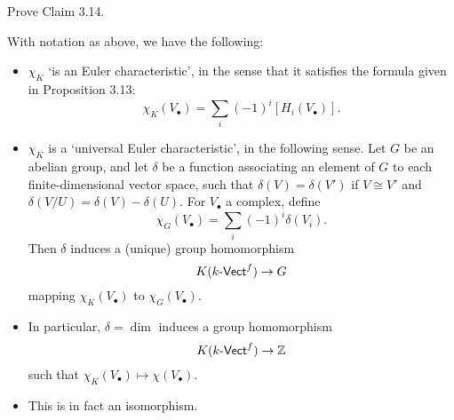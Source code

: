 \documentclass[../../master.tex]{subfiles}
\begin{document}
\begin{problem}
    Prove Claim 3.14.
    \begin{proposition}[Claim 3.14] 
        With notation as above, we have the following:
        \begin{itemize}
            \item $\chi_K$ `is an Euler characteristic', in the sense that it satisfies the formula given in Proposition 3.13:
                \[
                    \chi_K(V_{\bullet}) = \sum_i (-1)^{i} [H_i(V_{\bullet})].
                \]
            \item $\chi_K$ is a `universal Euler characteristic', in the following sense.
                Let $G$ be an abelian group, and let $\delta$ be a function associating an element of $G$ to each finite-dimensional vector space, such that $\delta(V) = \delta(V')$ if $V \cong V'$ and $\delta(V / U) = \delta(V) - \delta(U)$.
                For $V_{\bullet}$ a complex, define
                \[
                    \chi_G(V_{\bullet}) = \sum_i (-1)^{i} \delta(V_i).
                \]
                Then $\delta$ induces a (unique) group homomorphism
                \[
                K(k \textup{-}\mathsf{Vect}^{f}) \to G
                \]
                mapping $\chi_K(V_{\bullet})$ to $\chi_G(V_{\bullet})$.
            \item In particular, $\delta = \dim$ induces a group homomorphism
                \[
                K(k \textup{-}\mathsf{Vect}^{f}) \to \mathbb{Z}
                \]
                such that $\chi_K(V_{\bullet}) \mapsto \chi(V_{\bullet})$.
            \item This is in fact an isomorphism.
        \end{itemize}
    \end{proposition}
\end{problem}
\end{document}
